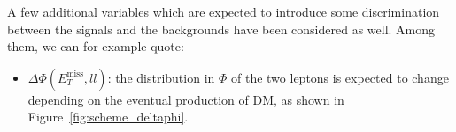 \documentclass[a4paper, 10pt, openright]{report}
\begin{document}
A few additional variables which are expected to introduce some discrimination between the signals and the backgrounds have been considered as well. Among them, we can for example quote:
\begin{itemize}
%
%

\item $\Delta \Phi(E_{T}^{\text{miss}}, ll)$: the distribution in $\Phi$ of the two leptons is expected to change depending on the eventual production of \ac{DM}, as shown in Figure~\ref{fig:scheme_deltaphi}.%


\end{itemize}
\end{document}
